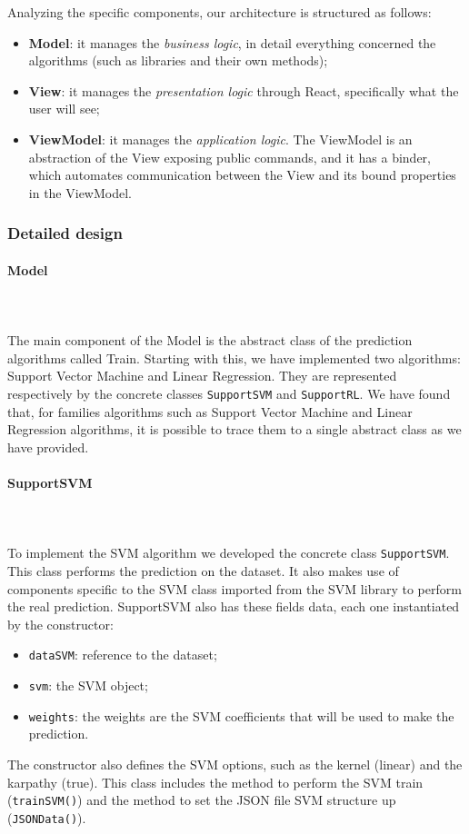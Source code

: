Analyzing the specific components, our architecture is structured as follows:
\begin{itemize}
\item \textbf{Model}: it manages the \textit{business logic}, in detail everything concerned the algorithms (such as libraries and their own methods);
\item \textbf{View}: it manages the \textit{presentation logic} through React, specifically what the user will see;
\item \textbf{ViewModel}: it manages the \textit{application logic}\glo. The ViewModel is an abstraction of the View exposing public commands, and  it has a binder, which automates communication between the View and its bound properties in the ViewModel.
\end{itemize}

\subsubsection{Detailed design}

\paragraph{Model}\mbox{} \\ \mbox{} \\
The main component of the Model is the abstract class of the prediction algorithms called Train. Starting with this, we have implemented two algorithms: Support Vector Machine and Linear Regression.
They are represented respectively by the concrete classes \texttt{SupportSVM}
and \texttt{SupportRL}. We have found that, for families algorithms such as Support Vector Machine and Linear Regression algorithms, it is possible to trace them to a single abstract class as we have provided. 

\paragraph*{SupportSVM}\mbox{} \\ \mbox{} \\
To implement the SVM algorithm we developed the concrete class \texttt{SupportSVM}. This class performs the prediction on the dataset. 
It also makes use of components specific to the SVM class imported from the SVM library to perform the real prediction. SupportSVM also has these fields data, each one instantiated by the constructor: \begin{itemize}
\item \texttt{dataSVM}: reference to the dataset;
\item \texttt{svm}: the SVM object;
\item \texttt{weights}: the weights are the SVM coefficients that will be used to make the prediction.
\end{itemize}
The constructor also defines the SVM options, such as the kernel (linear) and the karpathy (true). This class includes the method to perform the SVM train (\texttt{trainSVM()}) and the method to set the JSON file SVM structure up (\texttt{JSONData()}).


